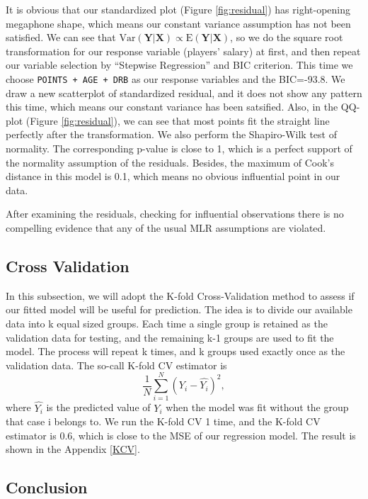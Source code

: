 \documentclass[12pt,]{article}
\begin{document}
It is obvious that our standardized plot (Figure \ref{fig:residual}) has
right-opening megaphone shape, which means our constant variance
assumption has not been satisfied. We can see that
\(\text{Var}(\mathbf Y|\mathbf X)\propto \text{E}(\mathbf Y|\mathbf X)\),
so we do the square root transformation for our response variable
(players' salary) at first, and then repeat our variable selection by
``Stepwise Regression'' and BIC criterion. This time we choose
\texttt{POINTS\ +\ AGE\ +\ DRB} as our response variables and the
BIC=-93.8. We draw a new scatterplot of standardized residual, and it
does not show any pattern this time, which means our constant variance
has been satsified. Also, in the QQ-plot (Figure \ref{fig:residual}), we
can see that most points fit the straight line perfectly after the
transformation. We also perform the Shapiro-Wilk test of normality. The
corresponding p-value is close to 1, which is a perfect support of the
normality assumption of the residuals. Besides, the maximum of Cook's
distance in this model is 0.1, which means no obvious influential point
in our data.

After examining the residuals, checking for influential observations
there is no compelling evidence that any of the usual MLR assumptions
are violated.

\subsection{Cross Validation}

In this subsection, we will adopt the K-fold Cross-Validation method to
assess if our fitted model will be useful for prediction. The idea is to
divide our available data into k equal sized groups. Each time a single
group is retained as the validation data for testing, and the remaining
k-1 groups are used to fit the model. The process will repeat k times,
and k groups used exactly once as the validation data. The so-call
K-fold CV estimator is \[\frac1N\sum_{i=1}^N (Y_i- \hat{Y_i})^2,\] where
\(\hat{Y_i}\) is the predicted value of \(Y_i\) when the model was fit
without the group that case i belongs to. We run the K-fold CV 1 time,
and the K-fold CV estimator is 0.6, which is close to the MSE of our
regression model. The result is shown in the Appendix \ref{KCV}.

\subsection{Conclusion}
\end{document}
